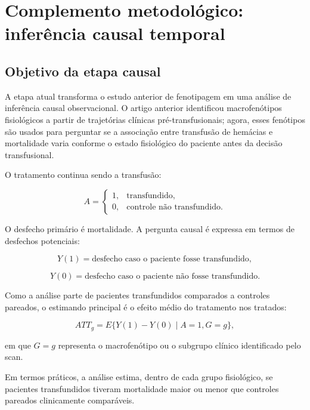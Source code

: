 
\providecommand{\pp}{\,\text{pp}}
\providecommand{\h}{\,\text{h}}
\providecommand{\mcgkgmin}{\,\text{mcg/kg/min}}
\providecommand{\code}[1]{\texttt{#1}}

\section{Complemento metodológico: inferência causal temporal}

\subsection{Objetivo da etapa causal}

A etapa atual transforma o estudo anterior de fenotipagem em uma análise de inferência causal observacional. O artigo anterior identificou macrofenótipos fisiológicos a partir de trajetórias clínicas pré-transfusionais; agora, esses fenótipos são usados para perguntar se a associação entre transfusão de hemácias e mortalidade varia conforme o estado fisiológico do paciente antes da decisão transfusional.

O tratamento continua sendo a transfusão:

\[
A =
\begin{cases}
1, & \text{transfundido},\\
0, & \text{controle não transfundido}.
\end{cases}
\]

O desfecho primário é mortalidade. A pergunta causal é expressa em termos de desfechos potenciais:

\[
Y(1) = \text{desfecho caso o paciente fosse transfundido},
\]

\[
Y(0) = \text{desfecho caso o paciente não fosse transfundido}.
\]

Como a análise parte de pacientes transfundidos comparados a controles pareados, o estimando principal é o efeito médio do tratamento nos tratados:

\[
ATT_g = E\{Y(1)-Y(0)\mid A=1, G=g\},
\]

em que $G=g$ representa o macrofenótipo ou o subgrupo clínico identificado pelo scan.

\begin{boxsummary}
Em termos práticos, a análise estima, dentro de cada grupo fisiológico, se pacientes transfundidos tiveram mortalidade maior ou menor que controles pareados clinicamente comparáveis.
\end{boxsummary}

